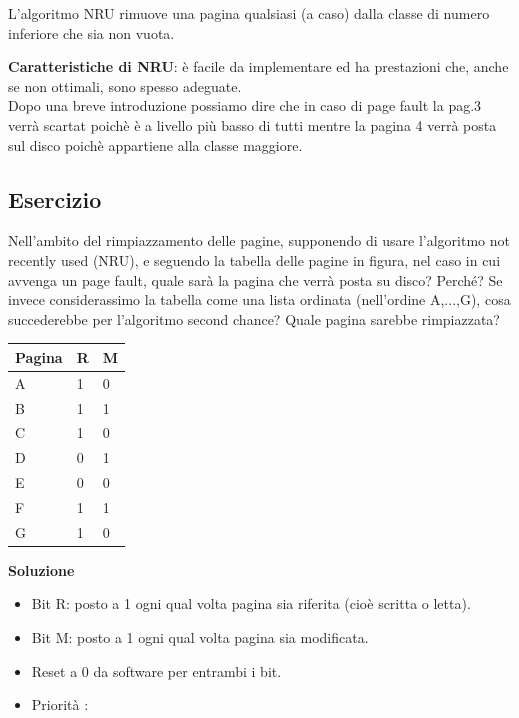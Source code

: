 \documentclass{article}
\begin{document}
\vskip 0.5cm
 L'algoritmo NRU rimuove una pagina qualsiasi (a caso) dalla classe di numero inferiore che sia non vuota.\\
 
 \vskip 0.5cm
 
 \textbf{ Caratteristiche di NRU}: è facile da implementare ed  ha prestazioni che, anche se non ottimali, sono spesso adeguate.\\

 \vskip 0.5cm
 Dopo una breve introduzione possiamo dire che in caso di page fault la pag.3 verrà scartat poichè è a livello più basso di tutti mentre la pagina 4 verrà posta sul disco poichè appartiene alla classe maggiore.


\subsection{Esercizio}

Nell’ambito del rimpiazzamento delle pagine, supponendo di usare l’algoritmo not recently used (NRU), e seguendo la tabella delle pagine in figura, nel caso in cui avvenga
un page fault, quale sarà la pagina che verrà posta su disco? Perché?
Se invece considerassimo la tabella come una lista ordinata (nell’ordine A,...,G), cosa succederebbe per l’algoritmo second chance? Quale pagina sarebbe rimpiazzata?

\vskip 0.5cm


\begin{tabular}{|p{}|p{}|p{}|}
\hline
Pagina         & R        & M            \\
\hline
A            & 1     & 0                 \\
B            & 1     & 1                  \\
C            & 1     & 0                  \\
D            & 0     & 1                    \\
E            & 0     & 0                   \\
F            & 1     & 1                   \\
G            & 1     & 0                   \\
\hline
\end{tabular}

\vskip 1.5cm

\textbf{Soluzione}\\

\begin{itemize}
\item Bit R: posto a 1 ogni qual volta pagina sia riferita (cioè scritta o letta).
\item Bit M: posto a 1 ogni qual volta pagina sia modificata.
\item  Reset a 0 da software per entrambi i bit.
\item  Priorità :
\end{itemize}
\end{document}
